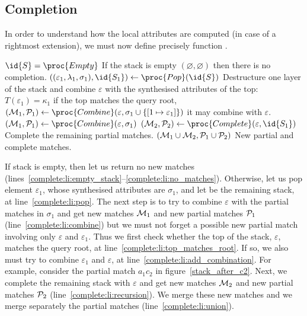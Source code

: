 \subsection{Completion}

In order to understand how the local attributes are computed (in case
of a rightmost extension), we must now define precisely function
.
\begin{codebox}
\li	\If \(\id{S} = \proc{Empty}\) \label{complete:li:empty_stack}
\RComment If the stack is empty
\li	\Then \Return \((\varnothing, \varnothing)\) 
\label{complete:li:no_matches}
\RComment then there is no completion.
	\End
\li	\(((\varepsilon_1, \lambda_1, \sigma_1), \id{S_1})
          \gets \proc{Pop} (\id{S})\)
    \label{complete:li:pop}
\RComment Destructure one layer of the stack
\zi
\RComment and combine \(\varepsilon\) with the synthesised attributes
of the top:
\li \If \(T(\varepsilon_1) = \kappa_1\)
\RComment if the top matches the query root,
\label{complete:li:top_matches_root}
\li \Then \(({\cal M}_1, {\cal P}_1) 
             \gets \proc{Combine} (\varepsilon, \sigma_1 \cup \{[1
             \mapsto \varepsilon_1]\})\)
\RComment it may combine with \(\varepsilon\).
\label{complete:li:add_combination}
\li \Else \(({\cal M}_1, {\cal P}_1) 
             \gets \proc{Combine} (\varepsilon, \sigma_1)\)
    \label{complete:li:combine}
    \End
\li \(({\cal M}_2, {\cal P}_2) 
       \gets \proc{Complete} (\varepsilon, \id{S_1})\)
    \label{complete:li:recursion}
\RComment Complete the remaining partial matches.
\li \Return \(({\cal M}_1 \cup {\cal M}_2, {\cal P}_1 \cup {\cal P}_2)\)
    \label{complete:li:union}
\RComment New partial and complete matches.
\end{codebox}
\noindent If stack  is empty, then let us return no new matches
(lines~\ref{complete:li:empty_stack}--\ref{complete:li:no_matches}). Otherwise,
let us pop element \(\varepsilon_1\), whose synthesised attributes are
\(\sigma_1\), and let  be the remaining stack, at
line~\ref{complete:li:pop}. The next step is to try to combine
\(\varepsilon\) with the partial matches in \(\sigma_1\) and get new
matches \({\cal M}_1\) and new partial matches \({\cal P}_1\)
(line~\ref{complete:li:combine}) but we must not forget a possible new
partial match involving only \(\varepsilon\) and
\(\varepsilon_1\). Thus we first check whether the top of the stack,
\(\varepsilon\), matches the query root, at
line~\ref{complete:li:top_matches_root}. If so, we also must try to
combine \(\varepsilon_1\) and \(\varepsilon\), at
line~\ref{complete:li:add_combination}. For example, consider the
partial match \(a_1c_2\) in figure~\ref{stack_after_c2}. Next, we
complete the remaining stack  with \(\varepsilon\) and get new
matches \({\cal M}_2\) and new partial matches \({\cal P}_2\)
(line~\ref{complete:li:recursion}). We merge these new matches and we
merge separately the partial matches (line~\ref{complete:li:union}).


